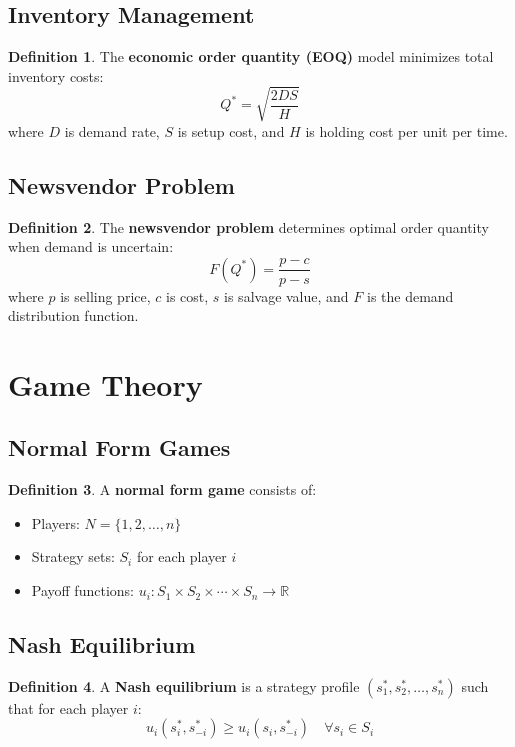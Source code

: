 \documentclass[11pt]{article}
\theoremstyle{definition}
\newtheorem{definition}{Definition}[section]
\begin{document}
\subsection{Inventory Management}
\begin{definition}
The \textbf{economic order quantity (EOQ)} model minimizes total inventory costs:
$$Q^* = \sqrt{\frac{2DS}{H}}$$
where $D$ is demand rate, $S$ is setup cost, and $H$ is holding cost per unit per time.
\end{definition}

\subsection{Newsvendor Problem}
\begin{definition}
The \textbf{newsvendor problem} determines optimal order quantity when demand is uncertain:
$$F(Q^*) = \frac{p-c}{p-s}$$
where $p$ is selling price, $c$ is cost, $s$ is salvage value, and $F$ is the demand distribution function.
\end{definition}

\section{Game Theory}

\subsection{Normal Form Games}
\begin{definition}
A \textbf{normal form game} consists of:
\begin{itemize}
    \item Players: $N = \{1, 2, \ldots, n\}$
    \item Strategy sets: $S_i$ for each player $i$
    \item Payoff functions: $u_i: S_1 \times S_2 \times \cdots \times S_n \to \mathbb{R}$
\end{itemize}
\end{definition}

\subsection{Nash Equilibrium}
\begin{definition}
A \textbf{Nash equilibrium} is a strategy profile $(s_1^*, s_2^*, \ldots, s_n^*)$ such that for each player $i$:
$$u_i(s_i^*, s_{-i}^*) \geq u_i(s_i, s_{-i}^*) \quad \forall s_i \in S_i$$
\end{definition}
\end{document}
